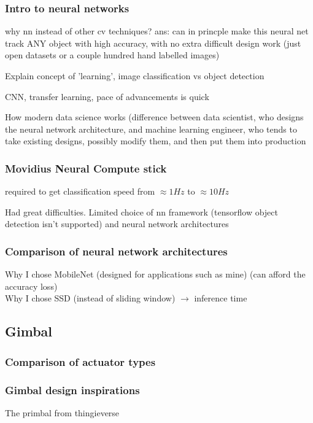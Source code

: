 \documentclass{article}
\begin{document}
\subsubsection{Intro to neural networks}
why nn instead of other cv techniques? ans: can in princple make this neural net track ANY object with high accuracy, with no extra difficult design work (just open datasets or a couple hundred hand labelled images)

Explain concept of 'learning', image classification vs object detection

CNN, transfer learning, pace of advancements is quick

How modern data science works (difference between data scientist, who designs the neural network architecture, and machine learning engineer, who tends to take existing designs, possibly modify them, and then put them into production

\subsubsection{Movidius Neural Compute stick}
required to get classification speed from $\approx 1 Hz$ to $\approx 10 Hz$

Had great difficulties. Limited choice of nn framework (tensorflow object detection isn't supported) and neural network architectures

\subsubsection{Comparison of neural network architectures}
Why I chose MobileNet (designed for applications such as mine) (can afford the accuracy loss)\\
Why I chose SSD (instead of sliding window) $\rightarrow$ inference time

\subsection{Gimbal}
\subsubsection{Comparison of actuator types}

\subsubsection{Gimbal design inspirations}
The primbal from thingieverse
\end{document}
